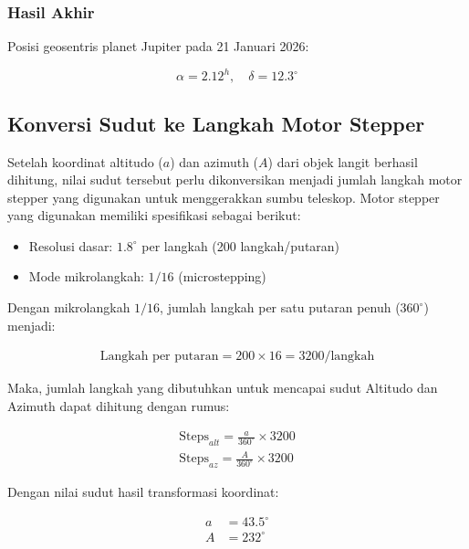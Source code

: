 \subsubsection*{Hasil Akhir}

Posisi geosentris planet Jupiter pada  
21 Januari 2026:

{\setlength{\abovedisplayskip}{8pt}%
\setlength{\belowdisplayskip}{8pt}%
\[
\alpha = 2.12^h,\quad
\delta = 12.3^\circ
\]
}
\subsection{Konversi Sudut ke Langkah Motor Stepper} \label{III.SudutStepper}

Setelah koordinat altitudo ($a$) dan azimuth ($A$) dari objek langit berhasil dihitung, nilai sudut tersebut perlu dikonversikan menjadi jumlah langkah motor stepper yang digunakan untuk menggerakkan sumbu teleskop. Motor stepper yang digunakan memiliki spesifikasi sebagai berikut:


\begin{itemize}[noitemsep]
	\item Resolusi dasar: $1.8^\circ$ per langkah (200 langkah/putaran)
	\item Mode mikrolangkah: $1/16$ (microstepping)
\end{itemize}

Dengan mikrolangkah $1/16$, jumlah langkah per satu putaran penuh ($360^\circ$) menjadi:

{\setlength{\abovedisplayskip}{8pt}%
	\setlength{\belowdisplayskip}{8pt}%
	\[
		\begin{split}
			\text{Langkah per putaran} = 200 \times 16 = 3200/\text{langkah}
		\end{split}
	\]}

Maka, jumlah langkah yang dibutuhkan untuk mencapai sudut Altitudo dan Azimuth dapat dihitung dengan rumus:

{\setlength{\abovedisplayskip}{8pt}%
	\setlength{\belowdisplayskip}{8pt}%
	\[
		\begin{split}
		\text{Steps}_{alt} = \frac{a}{360^\circ} \times 3200 \\
		\text{Steps}_{az} = \frac{A}{360^\circ} \times 3200
		\end{split}
	\]}

Dengan nilai sudut hasil transformasi koordinat:

{\setlength{\abovedisplayskip}{8pt}%
	\setlength{\belowdisplayskip}{8pt}%
	\[
	\begin{aligned}
	a &= 43.5^\circ \\
	A &= 232^\circ
	\end{aligned}
	\]}

